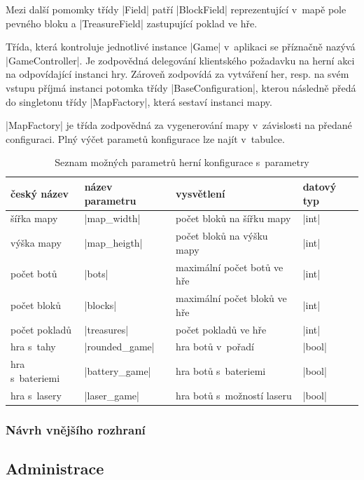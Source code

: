 Mezi další pomomky třídy \ic|Field| patří \ic|BlockField| reprezentující v~mapě pole pevného bloku a \ic|TreasureField| zastupující poklad ve hře.

Třída, která kontroluje jednotlivé instance \ic|Game| v~aplikaci se příznačně nazývá \ic|GameController|. Je zodpovědná delegování klientského požadavku na herní akci na odpovídající instanci hry. Zároveň zodpovídá za vytváření her, resp. na svém vstupu příjmá instanci potomka třídy \ic|BaseConfiguration|, kterou následně předá do singletonu třídy \ic|MapFactory|, která sestaví instanci mapy.

\ic|MapFactory| je třída zodpovědná za vygenerování mapy v~závislosti na předané configuraci. Plný výčet parametů konfigurace lze najít v~tabulce.

\begin{table}[H]
	\caption{Seznam možných parametrů herní konfigurace s~parametry}
	\label{table:conf-parameters}
	\centering
	\begin{tabular}{ l | l | l | l }
		český název & název parametru & vysvětlení & datový typ \\
		\hline
		šířka mapy & \ic|map_width| & počet bloků na šířku mapy & \ic|int| \\
		výška mapy & \ic|map_heigth| & počet bloků na výšku mapy & \ic|int| \\
		počet botů & \ic|bots| & maximální počet botů ve hře & \ic|int| \\
		počet bloků & \ic|blocks| & maximální počet bloků ve hře & \ic|int| \\
		počet pokladů & \ic|treasures| & počet pokladů ve hře & \ic|int| \\
		hra s~tahy & \ic|rounded_game| & hra botů v~pořadí & \ic|bool| \\
		hra s~bateriemi & \ic|battery_game| & hra botů s~bateriemi & \ic|bool| \\
		hra s~lasery & \ic|laser_game| & hra botů s~možností laseru & \ic|bool| \\
	\end{tabular}
\end{table}

\subsubsection{Návrh vnějšího rozhraní}


\subsection{Administrace}

